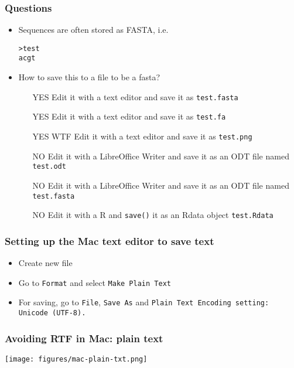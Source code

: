 \documentclass{beamer}
\begin{document}
\begin{frame}[fragile]
  \frametitle{Questions}
  \begin{itemize}
  \item Sequences are often stored as FASTA, i.e.
\begin{verbatim}
>test
acgt
\end{verbatim}
  \item How to save this to a file to be a fasta?
    \begin{enumerate}
    \item[YES] Edit it with a text editor and save it as \texttt{test.fasta} 
    \item[YES] Edit it with a text editor and save it as \texttt{test.fa}
    \item[YES WTF] Edit it with a text editor and save it as \texttt{test.png}
    \item[NO] Edit it with a LibreOffice Writer and save it as an ODT file named \texttt{test.odt}
    \item[NO] Edit it with a LibreOffice Writer and save it as an ODT file named \texttt{test.fasta}
    \item[NO] Edit it with a R and \texttt{save()} it as an Rdata object \texttt{test.Rdata}
    \end{enumerate}
  \end{itemize}
\end{frame}


\begin{frame}
  \frametitle{Setting up the Mac text editor to save text}

  \begin{itemize}
  \item Create new file
  \item Go to \texttt{Format} and select \texttt{Make Plain Text}
  \item For saving, go to \texttt{File}, \texttt{Save As} and \texttt{Plain Text Encoding setting: Unicode (UTF-8).}
 
  \end{itemize}

\end{frame}



\begin{frame}
  \frametitle{Avoiding RTF in Mac: plain text}
\centering
\texttt{[image: figures/mac-plain-txt.png]}
\end{frame}
\end{document}
